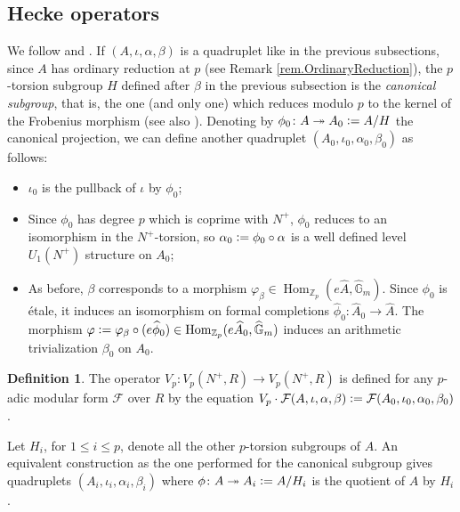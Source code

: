 \documentclass[a4paper]{amsart}
\numberwithin{equation}{section}
\theoremstyle{definition}
\newtheorem{definition}[theorem]{Definition}
\newcommand{\Z}{\mathbb{Z}}
\newcommand{\G}{\mathbb{G}}
\newcommand{\defeq}{\vcentcolon=}
\DeclareMathOperator{\Hom}{Hom}
\begin{document}
\subsection{Hecke operators}\label{subsec.HeckeOperators}
We follow \cite[\S II.2, II.3]{Gouvea} and \cite[\S 3.6]{Brooks}. If $(A,\iota,\alpha,\beta)$ is a quadruplet like in the previous subsections, since $A$ has ordinary reduction at $p$ (see Remark \ref{rem.OrdinaryReduction}), the $p$-torsion subgroup $H$ defined after $\beta$ in the previous subsection is the \textit{canonical subgroup}, that is, the one (and only one) which reduces modulo $p$ to the kernel of the Frobenius morphism (see also \cite[Theorem 1.11]{Kassaei.Thesis}). Denoting by $\phi_0\colon A\twoheadrightarrow A_0\defeq A/H$ the canonical projection, we can define another quadruplet $(A_0,\iota_0,\alpha_0,\beta_0)$ as follows:
\begin{itemize}
\item $\iota_0$ is the pullback of $\iota$ by $\phi_0$;

\item Since $\phi_0$ has degree $p$ which is coprime with $N^+$, $\phi_0$ reduces to an isomorphism in the $N^+$-torsion, so $\alpha_0\defeq\phi_0\circ\alpha$ is a well defined level $U_1(N^+)$ structure on $A_0$;

\item As before, $\beta$ corresponds to a morphism $\varphi_\beta\in\Hom_{\Z_p}(e\widehat{A},\widehat{\G}_m)$. Since $\phi_0$ is étale, it induces an isomorphism on formal completions $\widehat\phi_0\colon\widehat{A}_0\rightarrow\widehat{A}$. The morphism $\varphi\defeq\varphi_\beta\circ(e\widehat{\phi}_0)\in\Hom_{\Z_p}(e\widehat{A}_0,\widehat{\G}_m)$ induces an arithmetic trivialization $\beta_0$ on $A_0$.
\end{itemize}

\begin{definition}
The operator $V_p\colon V_p(N^+,R)\rightarrow V_p(N^+,R)$ is defined
for any $p$-adic modular form $\mathcal{F}$ over $R$ by the equation
$V_p\cdot\mathcal{F}(A,\iota,\alpha,\beta)\defeq \mathcal{F}(A_0,\iota_0,\alpha_0,\beta_0)$.
\end{definition}

Let $H_i$, for $1\le i\le p$, denote all the other $p$-torsion subgroups of $A$. An equivalent construction as the one performed for the canonical subgroup gives quadruplets $(A_i,\iota_i,\alpha_i,\beta_i)$ where $\phi\colon A\twoheadrightarrow A_i\defeq A/H_i$ is the quotient of $A$ by $H_i$.
\end{document}
